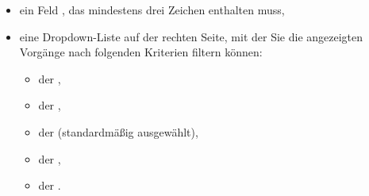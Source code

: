 \begin{itemize}
	\item ein Feld , das mindestens drei Zeichen enthalten muss,
	\item eine Dropdown-Liste auf der rechten Seite, mit der Sie die angezeigten Vorgänge nach folgenden Kriterien filtern können:
		\begin{itemize} 
			\item der ,
			\item der ,
			\item der  (standardmäßig ausgewählt),
			\item der ,
			\item der .

\end{itemize}
\end{itemize}
